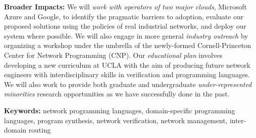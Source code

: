 \documentclass[12pt]{article}
\begin{document}
\noindent
\textbf{Broader Impacts:} 
We will 
\emph{work with
operators of two major clouds}, Microsoft Azure and Google,
to identify the pragmatic barriers to adoption, evaluate our proposed solutions using the policies of real industrial networks, and deploy our system where possible.   We will also engage in more general \emph{industry outreach}
by organizing a workshop under
the umbrella of the newly-formed
Cornell-Princeton Center for Network Programming (CNP).
Our \emph{educational plan} involves
developing a new curriculum at UCLA with the aim of producing
future network engineers with interdisciplinary skills in verification
and programming languages.  
We will also work to provide both
graduate and undergraduate
\emph{under-represented minorities} research opportunities as we
have successfully done in the past.

\medskip
\noindent\textbf{Keywords:} network programming languages, 
domain-specific programming languages, program synthesis, 
network verification, network management, inter-domain routing
\end{document}
